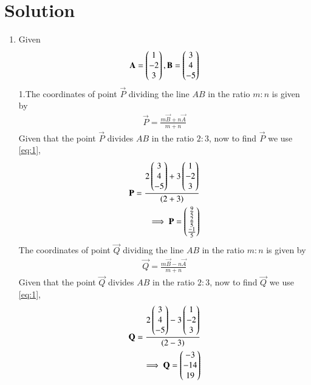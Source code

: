 \documentclass[journal,12pt,twocolumn]{IEEEtran}
\begin{document}
\section{Solution}
\begin{enumerate}
\item Given 
\begin{align}
  \mathbf{A} = \begin{pmatrix}1 \\ -2 \\ 3\end{pmatrix}, \mathbf{B}=\begin{pmatrix}3 \\ 4\\ -5\end{pmatrix} \label{eq:1}
\end{align}
1.The coordinates of point $\vec{P}$ dividing the line $AB$ in the ratio $m:n$ is given by 
\begin{align}
\vec{P} = \frac{m\vec{B}+n\vec{A}}{m+n}  \label{2.0.2}
\end{align}
Given that the point $\vec{P}$ divides $AB$ in the ratio $2:3$, now to find $\vec{P}$ we use \eqref{eq:1},
\begin{align}
\mathbf{P}=\frac{2\begin{pmatrix}3\\4\\-5\end{pmatrix}+3\begin{pmatrix}1\\-2\\3\end{pmatrix}}
{(2+3)}
\\
\implies\mathbf{P}=\begin{pmatrix}{\frac{9}{5}} \\ {\frac{2}{5}} \\ {\frac{-1}{5}}\end{pmatrix}
\end{align}
 The coordinates of point $\vec{Q}$ dividing the line $AB$ in the ratio $m:n$ is given by 
\begin{align}
 \vec{Q} = \frac{m\vec{B}-n\vec{A}}{m+n}  \label{2.0.5}
\end{align}
Given that the point $\vec{Q}$ divides $AB$ in the ratio $2:3$, now to find $\vec{Q}$ we use \eqref{eq:1},
\begin{align}
\mathbf{Q}=\frac{2\begin{pmatrix}3\\4\\-5\end{pmatrix}-3\begin{pmatrix}1\\-2\\3\end{pmatrix}}
{(2-3)}
\\
\implies\mathbf{Q}=\begin{pmatrix}-3\\-14\\19\end{pmatrix}
\end{align}
\end{enumerate}
\end{document}
